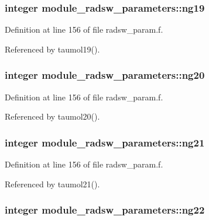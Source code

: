 \subsubsection[{\texorpdfstring{ng19}{ng19}}]{\setlength{\rightskip}{0pt plus 5cm}integer module\+\_\+radsw\+\_\+parameters\+::ng19}\hypertarget{group__module__radsw__main_gab3551e23105cd3515e887e877407dc39}{}\label{group__module__radsw__main_gab3551e23105cd3515e887e877407dc39}


Definition at line 156 of file radsw\+\_\+param.\+f.



Referenced by taumol19().

\subsubsection[{\texorpdfstring{ng20}{ng20}}]{\setlength{\rightskip}{0pt plus 5cm}integer module\+\_\+radsw\+\_\+parameters\+::ng20}\hypertarget{group__module__radsw__main_ga1619a2243f1cb29e4393598fa0bc4c8f}{}\label{group__module__radsw__main_ga1619a2243f1cb29e4393598fa0bc4c8f}


Definition at line 156 of file radsw\+\_\+param.\+f.



Referenced by taumol20().

\subsubsection[{\texorpdfstring{ng21}{ng21}}]{\setlength{\rightskip}{0pt plus 5cm}integer module\+\_\+radsw\+\_\+parameters\+::ng21}\hypertarget{group__module__radsw__main_gab029caf0ee0c1195539643bef00e0598}{}\label{group__module__radsw__main_gab029caf0ee0c1195539643bef00e0598}


Definition at line 156 of file radsw\+\_\+param.\+f.



Referenced by taumol21().

\subsubsection[{\texorpdfstring{ng22}{ng22}}]{\setlength{\rightskip}{0pt plus 5cm}integer module\+\_\+radsw\+\_\+parameters\+::ng22}\hypertarget{group__module__radsw__main_ga655c1f742fc97d58c32131e8a85cb6fd}{}\label{group__module__radsw__main_ga655c1f742fc97d58c32131e8a85cb6fd}


